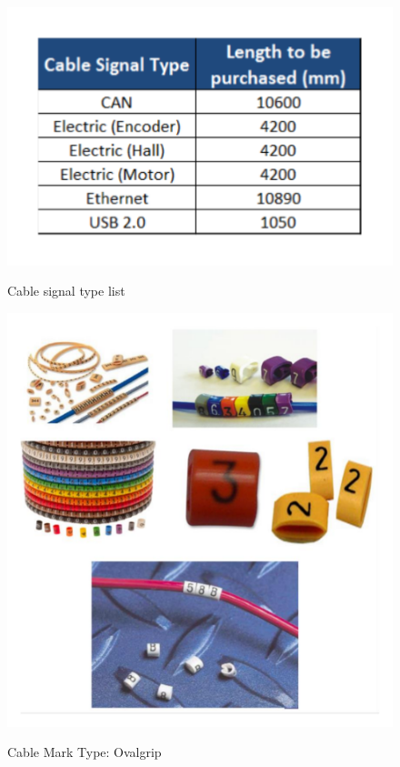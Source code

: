 \begin{figure}
  \centering
  \includegraphics[angle=90,width=1\columnwidth]{figs/body02/FIGCABLETYPELIST.pdf}\\
  \caption[Cable signal type list]{Cable signal type list}
  \label{FIG:CABLETYPELIST}
\end{figure}
\begin{figure}
  \centering
  \includegraphics[angle=90,width=1\columnwidth]{figs/body02/FIGOVALGRIP.pdf}\\
  \caption[Cable Mark Type: Ovalgrip]{Cable Mark Type: Ovalgrip}
  \label{FIG:OVALGRIP}
\end{figure}


